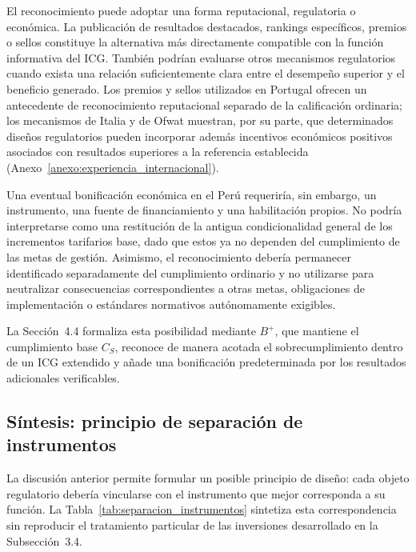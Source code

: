 El reconocimiento puede adoptar una forma reputacional, regulatoria o económica. La publicación de resultados destacados, rankings específicos, premios o sellos constituye la alternativa más directamente compatible con la función informativa del ICG. También podrían evaluarse otros mecanismos regulatorios cuando exista una relación suficientemente clara entre el desempeño superior y el beneficio generado. Los premios y sellos utilizados en Portugal ofrecen un antecedente de reconocimiento reputacional separado de la calificación ordinaria; los mecanismos de Italia y de Ofwat muestran, por su parte, que determinados diseños regulatorios pueden incorporar además incentivos económicos positivos asociados con resultados superiores a la referencia establecida (Anexo~\ref{anexo:experiencia_internacional}).

Una eventual bonificación económica en el Perú requeriría, sin embargo, un instrumento, una fuente de financiamiento y una habilitación propios. No podría interpretarse como una restitución de la antigua condicionalidad general de los incrementos tarifarios base, dado que estos ya no dependen del cumplimiento de las metas de gestión. Asimismo, el reconocimiento debería permanecer identificado separadamente del cumplimiento ordinario y no utilizarse para neutralizar consecuencias correspondientes a otras metas, obligaciones de implementación o estándares normativos autónomamente exigibles.

La Sección~4.4 formaliza esta posibilidad mediante \(B^{+}\), que mantiene el cumplimiento base \(C_S\), reconoce de manera acotada el sobrecumplimiento dentro de un ICG extendido y añade una bonificación predeterminada por los resultados adicionales verificables.

\subsection{Síntesis: principio de separación de instrumentos}

La discusión anterior permite formular un posible principio de diseño: cada objeto regulatorio debería vincularse con el instrumento que mejor corresponda a su función. La Tabla~\ref{tab:separacion_instrumentos} sintetiza esta correspondencia sin reproducir el tratamiento particular de las inversiones desarrollado en la Subsección~3.4.

